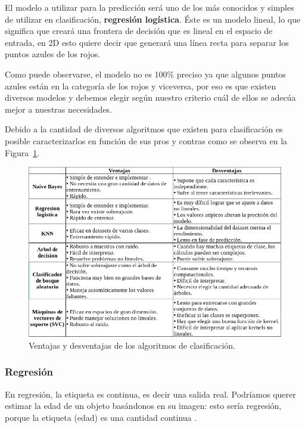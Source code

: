 \documentclass[a4paper,12pt]{article}
\begin{document}
El modelo a utilizar para la predicción será uno de los más conocidos y simples de utilizar en clasificación, \textbf{regresión logística}. Éste es un modelo lineal, lo que significa que creará una frontera de decisión que es lineal en el espacio de entrada, en 2D esto quiere decir que generará una línea recta para separar los puntos azules de los rojos.

Como puede observarse, el modelo no es 100\% preciso ya que algunos puntos azules están en la categoría de los rojos y viceversa, por eso es que existen diversos modelos y debemos elegir según nuestro criterio cuál de ellos se adecúa mejor a nuestras necesidades.

Debido a la cantidad de diversos algoritmos que existen para clasificación es posible caracterizarlos en función de sus pros y contras como se observa en la Figura~\ref{fig:proconsclassification.}.

\begin{figure}[H]
	\begin{center}				
	\includegraphics[width=1\textwidth]{tesis_6.png}
  	\caption{Ventajas y desventajas de los algoritmos de clasificación.}
  	\label{fig:proconsclassification.}
  	\end{center}
\end{figure}

\subsubsection{Regresión}

En regresión, la etiqueta es continua, es decir una salida real. Podríamos querer estimar la edad de un objeto basándonos en su imagen: esto sería regresión, porque la etiqueta (edad) es una cantidad continua \citep{GitHubpa25:online}.
\end{document}
